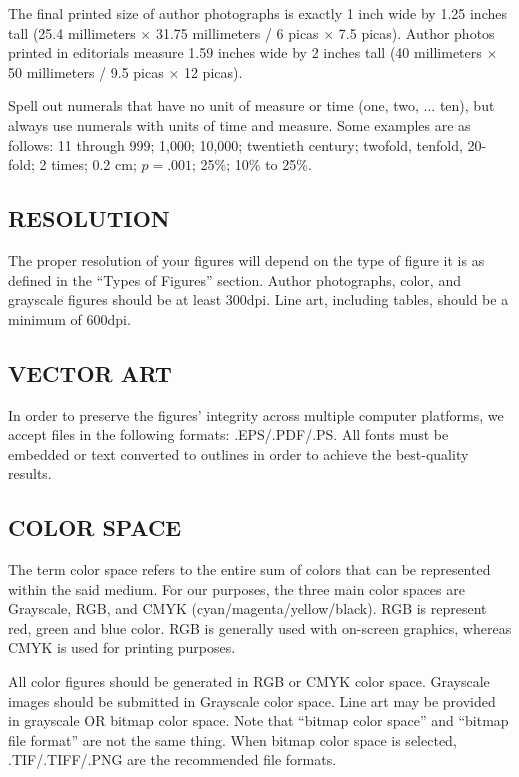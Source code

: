 \documentclass{IEEEojcsys}
\begin{document}
The final printed size of author photographs is exactly 1 inch wide by 1.25 inches tall (25.4 millimeters $\times$ 31.75 millimeters / 6 picas $\times$ 7.5 picas). Author photos printed in editorials measure 1.59 inches wide by 2 inches tall (40 millimeters $\times$ 50 millimeters / 9.5 picas $\times$ 12 picas).

Spell out numerals that have no unit of measure or time (one,  two, ... ten),  but  always  use  numerals  with  units  of time  and  measure.  Some  examples are as follows: 11 through 999; 1,000; 10,000;  twentieth  century;  twofold, tenfold, 20-fold; 2 times; 0.2 cm; $p=.001$; 25\%; 10\% to 25\%.


\subsection{RESOLUTION}

The proper resolution of your figures will depend on the type of figure it is as defined in the ``Types of Figures'' section. Author photographs, color, and grayscale figures should be at least 300dpi. Line art, including tables, should be a minimum of 600dpi.

\subsection{VECTOR ART}

In order to preserve the figures' integrity across multiple computer platforms, we accept files in the following formats: .EPS/.PDF/.PS. All fonts must be embedded or text converted to outlines in order to achieve the best-quality results.

\subsection{COLOR SPACE}

The term color space refers to the entire sum of colors that can be represented within the said medium. For our purposes, the three main color spaces are Grayscale, RGB, and CMYK (cyan/magenta/yellow/black). RGB is  represent red, green and blue color. RGB is generally used with on-screen graphics, whereas CMYK is used for printing purposes.

All color figures should be generated in RGB or CMYK color space. Grayscale images should be submitted in Grayscale color space. Line art may be provided in grayscale OR bitmap color space. Note that ``bitmap color space'' and ``bitmap file format'' are not the same thing. When bitmap color space is selected, .TIF/.TIFF/.PNG are the recommended file formats.
\end{document}
